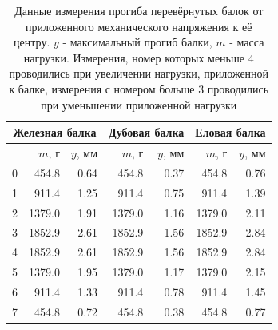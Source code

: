 \documentclass[12pt]{article}
\begin{document}
\begin{table}[H]
    \centering
    \begin{tabular}{|r|r|r|r|r|r|r|}
        \hline
        \multicolumn{3}{|c|}{Железная балка} & 
        \multicolumn{2}{|c|}{Дубовая балка}  & 
        \multicolumn{2}{|c|}{Еловая балка}                                                            \\
        \hline
                                             & $m$, г & $y$, мм & $m$, г & $y$, мм & $m$, г & $y$, мм \\
        \hline
        0                                    & 454.8  & 0.64    & 454.8  & 0.37    & 454.8  & 0.76    \\
        1                                    & 911.4  & 1.25    & 911.4  & 0.75    & 911.4  & 1.39    \\
        2                                    & 1379.0 & 1.91    & 1379.0 & 1.16    & 1379.0 & 2.11    \\
        3                                    & 1852.9 & 2.61    & 1852.9 & 1.56    & 1852.9 & 2.84    \\
        4                                    & 1852.9 & 2.61    & 1852.9 & 1.56    & 1852.9 & 2.84    \\
        5                                    & 1379.0 & 1.95    & 1379.0 & 1.17    & 1379.0 & 2.15    \\
        6                                    & 911.4  & 1.33    & 911.4  & 0.78    & 911.4  & 1.45    \\
        7                                    & 454.8  & 0.72    & 454.8  & 0.38    & 454.8  & 0.77    \\
        \hline
    \end{tabular}
    
    \caption{Данные измерения прогиба перевёрнутых балок от приложенного механического напряжения к её центру. $y$ - максимальный прогиб балки,
        $m$ - масса нагрузки. Измерения, номер которых меньше 4 проводились при увеличении нагрузки, приложенной к балке, измерения с номером больше 3 проводились при уменьшении приложенной нагрузки}
    \label{tab:3}
\end{table}
\end{document}
